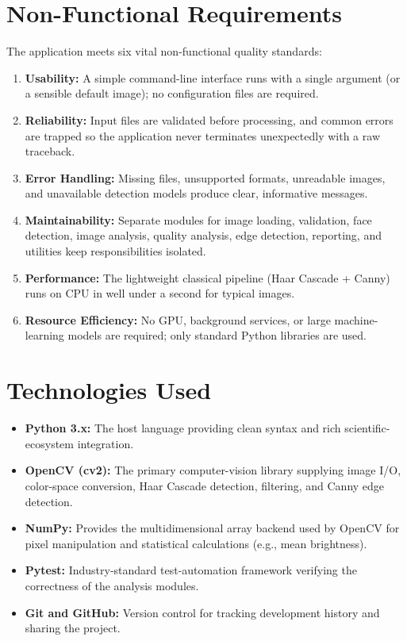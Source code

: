 \documentclass[11pt,a4paper]{article}
\begin{document}
\section{Non-Functional Requirements}
The application meets six vital non-functional quality standards:
\begin{enumerate}[leftmargin=1.5em]
    \item \textbf{Usability:} A simple command-line interface runs with a single argument (or a sensible default image); no configuration files are required.
    \item \textbf{Reliability:} Input files are validated before processing, and common errors are trapped so the application never terminates unexpectedly with a raw traceback.
    \item \textbf{Error Handling:} Missing files, unsupported formats, unreadable images, and unavailable detection models produce clear, informative messages.
    \item \textbf{Maintainability:} Separate modules for image loading, validation, face detection, image analysis, quality analysis, edge detection, reporting, and utilities keep responsibilities isolated.
    \item \textbf{Performance:} The lightweight classical pipeline (Haar Cascade + Canny) runs on CPU in well under a second for typical images.
    \item \textbf{Resource Efficiency:} No GPU, background services, or large machine-learning models are required; only standard Python libraries are used.
\end{enumerate}

\section{Technologies Used}
\begin{itemize}[leftmargin=1.5em]
    \item \textbf{Python 3.x:} The host language providing clean syntax and rich scientific-ecosystem integration.
    \item \textbf{OpenCV (cv2):} The primary computer-vision library supplying image I/O, color-space conversion, Haar Cascade detection, filtering, and Canny edge detection.
    \item \textbf{NumPy:} Provides the multidimensional array backend used by OpenCV for pixel manipulation and statistical calculations (e.g., mean brightness).
    \item \textbf{Pytest:} Industry-standard test-automation framework verifying the correctness of the analysis modules.
    \item \textbf{Git and GitHub:} Version control for tracking development history and sharing the project.
\end{itemize}
\end{document}
